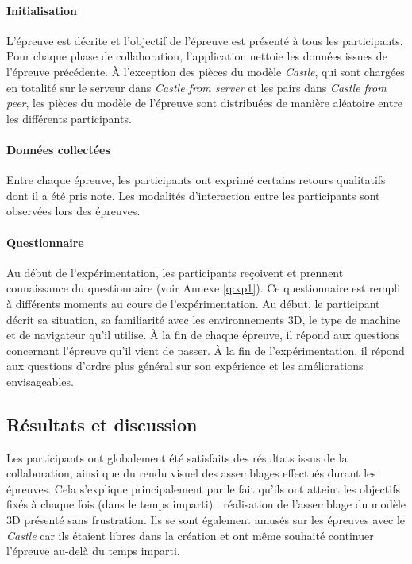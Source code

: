 \paragraph{Initialisation}

L'épreuve est décrite et l'objectif de l'épreuve est présenté à tous les participants.
Pour chaque phase de collaboration, l'application nettoie les données issues de 
l'épreuve précédente. 
À l'exception des pièces du modèle \textit{Castle}, qui sont chargées
en totalité sur le serveur dans \textit{Castle from server} et les pairs dans 
\textit{Castle from peer}, les pièces du modèle de l'épreuve 
sont distribuées de manière aléatoire entre les différents participants.

\paragraph{Données collectées}
Entre chaque épreuve, les 
participants ont exprimé certains retours qualitatifs dont il a été pris note. Les modalités d'interaction entre les participants sont observées lors des épreuves.

\paragraph{Questionnaire}
Au début de l'expérimentation, les participants reçoivent et prennent 
con\-naissance 
du questionnaire (voir Annexe \ref{q:xp1}). Ce questionnaire est rempli à différents 
moments au cours de l'expérimentation. Au début, le participant décrit sa situation, 
sa familiarité avec les environnements \gls{3D}, le type de machine et de 
navigateur qu'il utilise. À la fin de chaque épreuve, il répond aux questions concernant 
l'épreuve qu'il vient de passer. À la fin de l'expérimentation, il répond aux 
questions d'ordre plus général sur son expérience et les améliorations 
envisageables.
\subsection{Résultats et discussion}
Les participants ont globalement été satisfaits des résultats issus de la 
collaboration, ainsi que du rendu visuel des assemblages effectués durant les 
épreuves. Cela s'explique principalement par le fait qu'ils ont atteint les 
objectifs fixés à chaque fois (dans le temps imparti) : réalisation de l'assemblage du modèle \gls{3D} 
présenté sans frustration. Ils se sont également \og amusés\fg{} sur les épreuves
avec le \textit{Castle} car ils étaient libres dans la création et ont même souhaité 
continuer l'épreuve au-delà du temps imparti. 

